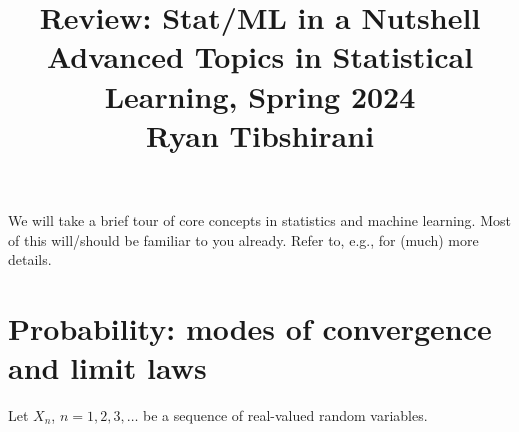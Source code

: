 \documentclass{article}
\title{Review: Stat/ML in a Nutshell \\ \smallskip
\large Advanced Topics in Statistical Learning, Spring 2024 \\ \smallskip
Ryan Tibshirani}
\date{}
\begin{document}
\maketitle
\RaggedRight
\vspace{-50pt}

We will take a brief tour of core concepts in statistics and machine learning. 
Most of this will/should be familiar to you already. Refer to, e.g.,
\citet{wasserman2004all, hastie2009elements} for (much) more details.

\section{Probability: modes of convergence and limit laws}

\def\asto{\overset{\mathrm{as}}{\to}}
\def\pto{\overset{p}{\to}}
\def\dto{\overset{d}{\to}}

Let $X_n$, $n=1,2,3,\dots$ be a sequence of real-valued random variables. 
\end{document}
